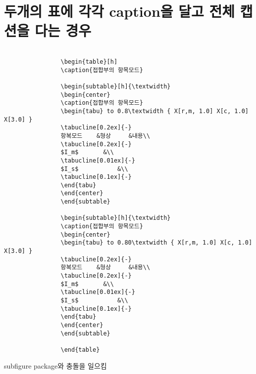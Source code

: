 	\section{두개의 표에 각각 caption을 달고 전체 캡션을 다는 경우}

			
		\begin{verbatim}
		
				\begin{table}[h]
				\caption{접합부의 항목모드}
		
				\begin{subtable}[h]{\textwidth}
				\begin{center}
				\caption{접합부의 항목모드}
				\begin{tabu} to 0.8\textwidth { X[r,m, 1.0] X[c, 1.0] X[3.0] }
				\tabucline[0.2ex]{-}		
				항복모드	&형상		&내용\\
				\tabucline[0.2ex]{-}		
				$I_m$		&\\
				\tabucline[0.01ex]{-}		
				$I_s$			&\\
				\tabucline[0.1ex]{-}		
				\end{tabu}
				\end{center}
				\end{subtable}
		
				\begin{subtable}[h]{\textwidth}
				\caption{접합부의 항목모드}
				\begin{center}
				\begin{tabu} to 0.80\textwidth { X[r,m, 1.0] X[c, 1.0] X[3.0] }
				\tabucline[0.2ex]{-}		
				항복모드	&형상		&내용\\
				\tabucline[0.2ex]{-}		
				$I_m$		&\\
				\tabucline[0.01ex]{-}		
				$I_s$			&\\
				\tabucline[0.1ex]{-}		
				\end{tabu}
				\end{center}
				\end{subtable}
		
				\end{table}
		\end{verbatim}

		subfigure package와 충돌을 일으킴


